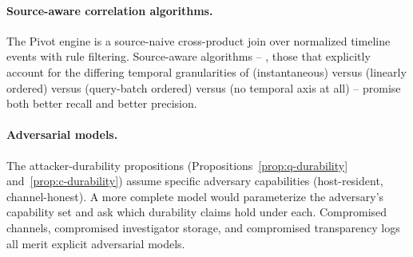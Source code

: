 \paragraph{Source-aware correlation algorithms.} The Pivot engine is a
source-naive cross-product join over normalized timeline events with rule
filtering. Source-aware algorithms -- \eg{}, those that explicitly account
for the differing temporal granularities of  (instantaneous) versus
 (linearly ordered) versus  (query-batch ordered) versus
 (no temporal axis at all) -- promise both better recall and better
precision.

\paragraph{Adversarial models.} The attacker-durability propositions
(Propositions~\ref{prop:q-durability} and~\ref{prop:c-durability}) assume
specific adversary capabilities (host-resident, channel-honest). A more
complete model would parameterize the adversary's capability set and ask
which durability claims hold under each. Compromised channels, compromised
investigator storage, and compromised transparency logs all merit explicit
adversarial models.
